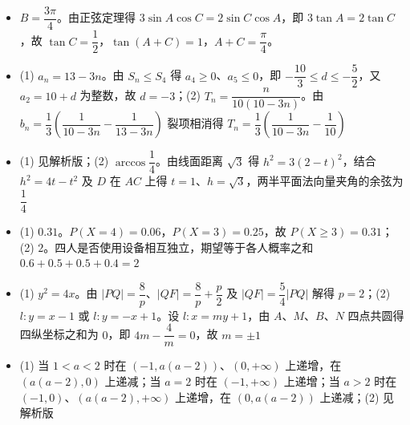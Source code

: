 \begin{itemize}[leftmargin=2.6em]
  \item[\textbf{17.}] $B=\dfrac{3\pi}{4}$。由正弦定理得 $3\sin A\cos C=2\sin C\cos A$，即 $3\tan A=2\tan C$，故 $\tan C=\dfrac12$，$\tan(A+C)=1$，$A+C=\dfrac{\pi}{4}$。
  \item[\textbf{18.}] (1) $a_n=13-3n$。由 $S_n\leqslant S_4$ 得 $a_4\geqslant0$、$a_5\leqslant0$，即 $-\dfrac{10}{3}\leqslant d\leqslant-\dfrac52$，又 $a_2=10+d$ 为整数，故 $d=-3$；(2) $T_n=\dfrac{n}{10(10-3n)}$。由 $b_n=\dfrac13\left(\dfrac1{10-3n}-\dfrac1{13-3n}\right)$ 裂项相消得 $T_n=\dfrac13\left(\dfrac1{10-3n}-\dfrac1{10}\right)$
  \item[\textbf{19.}] (1) 见解析版；(2) $\arccos\dfrac14$。由线面距离 $\sqrt3$ 得 $h^2=3(2-t)^2$，结合 $h^2=4t-t^2$ 及 $D$ 在 $AC$ 上得 $t=1$、$h=\sqrt3$，两半平面法向量夹角的余弦为 $\dfrac14$
  \item[\textbf{20.}] (1) $0.31$。$P(X=4)=0.06$，$P(X=3)=0.25$，故 $P(X\geqslant3)=0.31$；(2) $2$。四人是否使用设备相互独立，期望等于各人概率之和 $0.6+0.5+0.5+0.4=2$
  \item[\textbf{21.}] (1) $y^2=4x$。由 $|PQ|=\dfrac8p$、$|QF|=\dfrac8p+\dfrac p2$ 及 $|QF|=\dfrac54|PQ|$ 解得 $p=2$；(2) $l:y=x-1$ 或 $l:y=-x+1$。设 $l:x=my+1$，由 $A$、$M$、$B$、$N$ 四点共圆得四纵坐标之和为 $0$，即 $4m-\dfrac4m=0$，故 $m=\pm1$
  \item[\textbf{22.}] (1) 当 $1<a<2$ 时在 $(-1,a(a-2))$、$(0,+\infty)$ 上递增，在 $(a(a-2),0)$ 上递减；当 $a=2$ 时在 $(-1,+\infty)$ 上递增；当 $a>2$ 时在 $(-1,0)$、$(a(a-2),+\infty)$ 上递增，在 $(0,a(a-2))$ 上递减；(2) 见解析版
\end{itemize}
